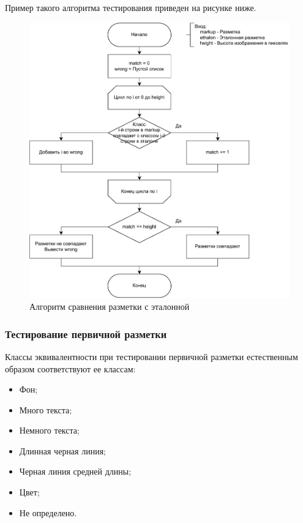 Пример такого алгоритма тестирования приведен на рисунке ниже.

\begin{figure}[H]
	\centering
    \includegraphics[width=\textwidth]{diag/vkr-test-primary.pdf}
	\caption{Алгоритм сравнения разметки с эталонной}
	\label{fig:test}
\end{figure}

\subsubsection{Тестирование первичной разметки}

Классы эквивалентности при тестировании первичной разметки естественным образом соответствуют ее классам:
\begin{itemize}
    \item Фон;
    \item Много текста;
    \item Немного текста;
    \item Длинная черная линия;
    \item Черная линия средней длины;
    \item Цвет;
    \item Не определено.
\end{itemize}

